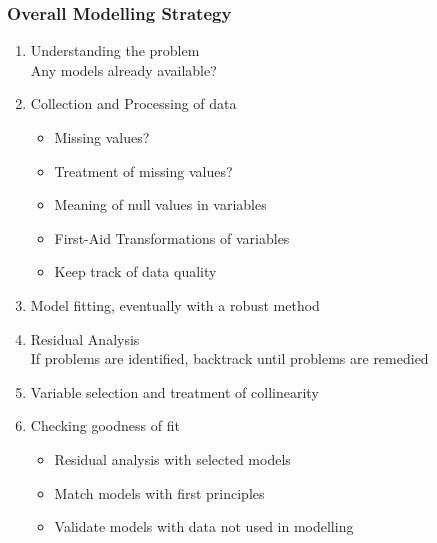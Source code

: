 \documentclass[11pt]{article}
\theoremstyle{definition}
\begin{document}
\subsubsection{Overall Modelling Strategy}
\begin{enumerate}
	\item Understanding the problem\\
	Any models already available?
	\item Collection and Processing of data
	\begin{itemize}
		\item Missing values?
		\item Treatment of missing values?
		\item Meaning of null values in variables
		\item First-Aid Transformations of variables
		\item Keep track of data quality
	\end{itemize}
	\item Model fitting, eventually with a robust method
	\item Residual Analysis\\
	If problems are identified, backtrack until problems are remedied
	\item Variable selection and treatment of collinearity
	\item Checking goodness of fit
	\begin{itemize}
		\item Residual analysis with selected models
		\item Match models with first principles
		\item Validate models with data not used in modelling
	\end{itemize}
\end{enumerate}
\end{document}
